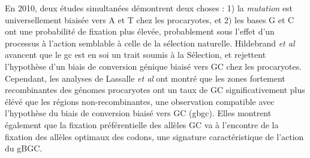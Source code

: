 En 2010, deux études simultanées\cite{hildebrand_evidence_2010,
	hershberg_evidence_2010} démontrent deux choses : 1) la \emph{mutation}
est universellement biaisée vers A et T chez les procaryotes, et 2) les bases G
et C ont une probabilité de fixation plus élevée, probablement sous l'effet
d'un processus à l'action semblable à celle de la sélection naturelle.
Hildebrand \emph{et al} avancent que le \ac{gc} est en soi un trait soumis à la
Sélection, et rejettent l'hypothèse d'un biais de conversion génique biaisé
vers GC chez les procaryotes. Cependant, les analyses de Lassalle \emph{et al}
\cite{lassalle_gc-content_2015} ont montré que les zones fortement
recombinantes des génomes procaryotes ont un taux de GC significativement plus
élévé que les régions non-recombinantes, une observation compatible avec
l'hypothèse du biais de conversion biaisé vers GC (\ac{gbgc}). Elles montrent
également que la fixation préférentielle des allèles GC va à l'encontre de la
fixation des allèles optimaux des codons, une signature caractéristique de
l'action du gBGC. %


